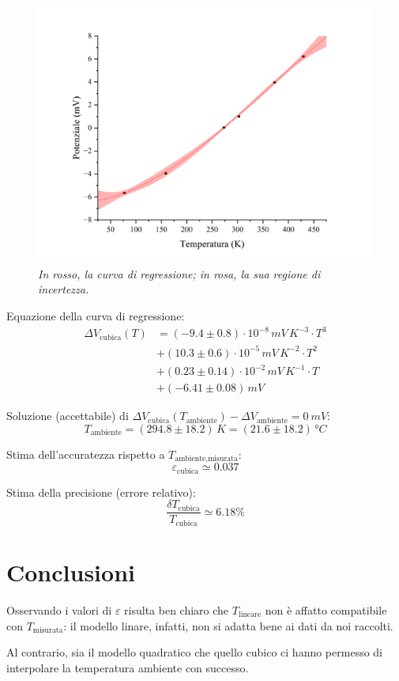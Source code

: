 \documentclass{article}
\begin{document}
\pagebreak
\begin{figure}[H]
  \centering
  \includegraphics[trim={2cm 0.6cm 3cm 1cm},clip,width=\textwidth]{img/regressione3.png}
  \caption*{\emph{
    In rosso, la curva di regressione; in rosa, la sua regione di incertezza.
  }}
\end{figure}

Equazione della curva di regressione:
\[\begin{aligned}\Delta V_\text{cubica}(T)
  &= (-9.4\pm0.8)\cdot10^{-8}\,\unit{mV\,K^{-3}}\cdot T^3 \\
  &+ (10.3\pm0.6)\cdot10^{-5}\,\unit{mV\,K^{-2}}\cdot T^2 \\
  &+ (0.23\pm0.14)\cdot10^{-2}\,\unit{mV\,K^{-1}}\cdot T \\
  &+ (-6.41\pm0.08)\,\unit{mV}
\end{aligned}\]

Soluzione (accettabile) di $
  \Delta V_\text{cubica}(T_\text{ambiente}) -
  \Delta V_\text{ambiente} = \qty{0}{mV}$:
\[T_\text{ambiente}
  = (294.8\pm18.2)\,\unit{K}
  = (21.6\pm18.2)\,\unit{\degree C}
\]

Stima dell'accuratezza rispetto a $T_\text{ambiente,misurata}$:
\[ \varepsilon_\text{cubica} \simeq 0.037 \]

Stima della precisione (errore relativo):
\[ \frac{\delta T_\text{cubica}}{T_\text{cubica}} \simeq 6.18\% \]

\pagebreak
\section{Conclusioni}

Osservando i valori di $\varepsilon$ risulta ben chiaro che
$T_\text{lineare}$ non è affatto compatibile con $T_\text{misurata}$:
il modello linare, infatti, non si adatta bene ai dati da noi raccolti.

Al contrario, sia il modello quadratico che quello cubico ci hanno
permesso di interpolare la temperatura ambiente con successo.
\end{document}
